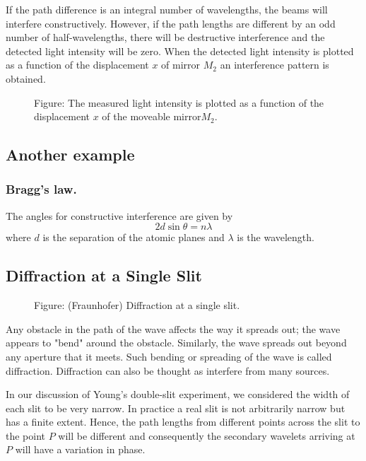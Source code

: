 \documentclass[../../../main.tex]{subfiles}
\begin{document}
If the path difference is an integral number of wavelengths, the beams will interfere constructively. However, if the path lengths are different by an odd number of half-wavelengths, there will be destructive interference and the detected light intensity will be zero. When the detected light intensity is plotted as a function of the displacement $x$ of mirror $M_2$ an interference pattern is obtained.
\begin{figure*}
    \centering
    \caption*{Figure: The measured light intensity is plotted as a function of the displacement $x$ of the moveable mirror$M_2$.}
\end{figure*}

\subsection*{Another example}
\subsubsection*{Bragg's law.} The angles for constructive interference are given by
\begin{equation*}
    2d \sin \theta = n\lambda
\end{equation*}
where $d$ is the separation of the atomic planes and $\lambda$ is the wavelength. 

\subsection*{Diffraction at a Single Slit}
\begin{figure*}
    \centering
    \caption*{Figure: (Fraunhofer) Diffraction at a single slit.}
\end{figure*}
Any obstacle in the path of the wave affects the way it spreads out; the wave appears to "bend" around the obstacle. Similarly, the wave spreads out beyond any aperture that it meets. Such bending or spreading of the wave is called diffraction. Diffraction can also be thought as interfere from many sources.

In our discussion of Young's double-slit experiment, we considered the width of each slit to be very narrow. In practice a real slit is not arbitrarily narrow but has a ﬁnite extent. Hence, the path lengths from different points across the slit to the point $P$ will be different and consequently the secondary wavelets arriving at $P$ will have a variation in phase.
\end{document}
